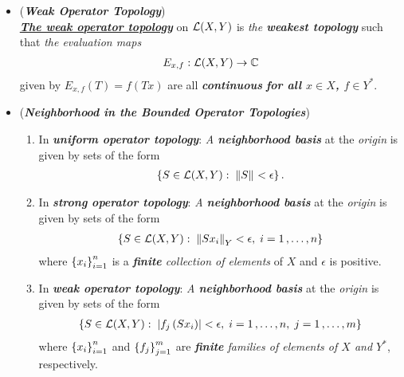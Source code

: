 \documentclass[11pt]{article}
\begin{document}
\begin{itemize}
\item \begin{definition}  (\emph{\textbf{Weak Operator Topology}})\\
\underline{\emph{\textbf{The weak operator topology}}} on  ${\mathcal L}(X, Y)$ is \emph{the \textbf{weakest topology}} such that \emph{the evaluation maps} 
\begin{align*}
E_{x, f}: {\mathcal L}(X, Y) \rightarrow {\mathbb C}
\end{align*}
given by $E_{x, f}(T) = f(Tx)$ are all \emph{\textbf{continuous}} \emph{\textbf{for all $x \in X$, $f \in Y^{*}$}}. 
\end{definition}

\item \begin{remark} (\emph{\textbf{Neighborhood in the Bounded Operator Topologies}})
\begin{enumerate}
\item In \emph{\textbf{uniform operator topology}}: \emph{A \textbf{neighborhood basis}} at the \emph{origin} is given by sets of the form 
\begin{align*}
\left\{S \in  {\mathcal L}(X, Y): \;\left\|S\right\|_{} < \epsilon\right\}.
\end{align*}

\item In \emph{\textbf{strong operator topology}}: \emph{A \textbf{neighborhood basis}} at the \emph{origin} is given by sets of the form 
\begin{align*}
\left\{S \in  {\mathcal L}(X, Y): \;\left\|Sx_i\right\|_{Y} < \epsilon, \; i=1 \,{,}\ldots{,}\, n\right\}
\end{align*}
where $\left\{x_i\right\}_{i=1}^{n}$ is a \emph{\textbf{finite} collection of elements} of $X$ and $\epsilon$ is positive.

\item  In \emph{\textbf{weak operator topology}}: \emph{A \textbf{neighborhood basis}} at the \emph{origin} is given by sets of the form 
\begin{align*}
\left\{S \in  {\mathcal L}(X, Y): \;\left\lvert f_j\left(Sx_i\right) \right\rvert < \epsilon, \; i=1 \,{,}\ldots{,}\, n, \; j=1 \,{,}\ldots{,}\, m \right\}
\end{align*}
where $\left\{x_i\right\}_{i=1}^{n}$ and $\left\{f_j\right\}_{j=1}^{m}$ are \emph{\textbf{finite} families of elements of $X$ and $Y^{*}$}, respectively.
\end{enumerate}
\end{remark}



\end{itemize}
\end{document}

